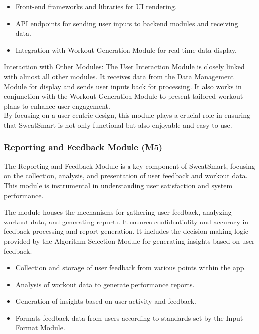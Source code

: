 \documentclass[12pt, titlepage]{article}
\begin{document}
\begin{description}[leftmargin=0pt]
\item[Interfaces:] 
\end{description}
\begin{itemize}[leftmargin=*]
\item Front-end frameworks and libraries for UI rendering.
\item API endpoints for sending user inputs to backend modules and receiving data.
\item Integration with Workout Generation Module for real-time data display.
\end{itemize}

Interaction with Other Modules: The User Interaction Module is closely linked with almost all other modules. It receives data from the Data Management Module for display and sends user inputs back for processing. It also works in conjunction with the Workout Generation Module to present tailored workout plans to enhance user engagement.
\\

By focusing on a user-centric design, this module plays a crucial role in ensuring that SweatSmart is not only functional but also enjoyable and easy to use.

\subsubsection{Reporting and Feedback Module (M5)}

The Reporting and Feedback Module is a key component of SweatSmart, focusing on the collection, analysis, and presentation of user feedback and workout data. This module is instrumental in understanding user satisfaction and system performance.

\begin{description}[leftmargin=0pt]
\item[Secrets:]
The module houses the mechanisms for gathering user feedback, analyzing workout data, and generating reports. It ensures confidentiality and accuracy in feedback processing and report generation. It includes the decision-making logic provided by the Algorithm Selection Module for generating insights based on user feedback.
\end{description}

\begin{description}[leftmargin=0pt]
\item[Services:]
\end{description}
\begin{itemize}[leftmargin=*]
\item Collection and storage of user feedback from various points within the app.
\item Analysis of workout data to generate performance reports.
\item Generation of insights based on user activity and feedback.
\item Formats feedback data from users according to standards set by the Input Format Module.
\end{itemize}
\end{document}
